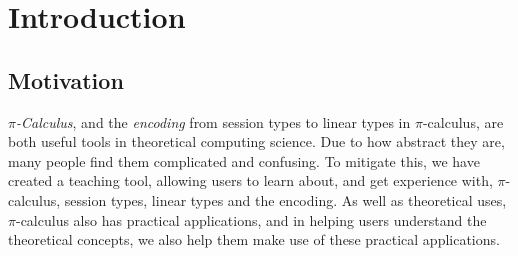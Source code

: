 \documentclass{l4proj}
\begin{document}
%
%
%
%
%
%
%
\chapter{Introduction}
\label{intro}


\section{Motivation}
\label{introMotiv}

\quad \emph{$\pi$-Calculus}, and the \emph{encoding} from session types to linear types in $\pi$-calculus, are both useful tools in theoretical computing science. Due to how abstract they are, many people find them complicated and confusing. To mitigate this, we have created a teaching tool, allowing users to learn about, and get experience with, $\pi$-calculus, session types, linear types and the encoding. As well as theoretical uses, $\pi$-calculus also has practical applications, and in helping users understand the theoretical concepts, we also help them make use of these practical applications.
\end{document}

